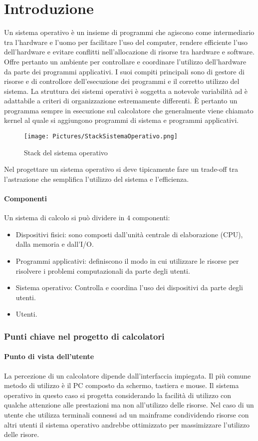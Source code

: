 \chapter{Introduzione}
Un sistema operativo è un insieme di programmi che agiscono come intermediario tra l'hardware e l'uomo per facilitare l'uso del computer, rendere efficiente l'uso dell'hardware e evitare conflitti
nell'allocazione di risorse tra hardware e software. Offre pertanto un ambiente per controllare e coordinare l'utilizzo dell'hardware da parte dei programmi applicativi. I suoi compiti principali sono di gestore di
risorse e di controllore dell'esecuzione dei programmi e il corretto utilizzo del sistema. La struttura dei sistemi operativi \`e soggetta a notevole variabilit\`a ad \`e adattabile a criteri di organizzazione estremamente differenti.
\`E pertanto un programma sempre in esecuzione sul calcolatore che generalmente viene chiamato kernel al quale si aggiungono programmi di sistema e programmi applicativi.
\begin{figure}[h]
	\texttt{[image: Pictures/StackSistemaOperativo.png]}
	\caption{Stack del sistema operativo}
\end{figure}
Nel progettare un sistema operativo si deve tipicamente fare un trade-off tra l'astrazione che semplifica l'utilizzo del sistema e l'efficienza.
\subsubsection{Componenti}
Un sistema di calcolo si pu\`o dividere in $4$ componenti:
\begin{itemize}
	\item Dispositivi fisici: sono composti dall'unit\`a centrale di elaborazione (CPU), dalla memoria e dall'I/O.
	\item Programmi applicativi: definiscono il modo in cui utilizzare le risorse per risolvere i problemi computazionali da parte degli utenti.
	\item Sistema operativo: Controlla e coordina l'uso dei dispositivi da parte degli utenti.
	\item Utenti.
\end{itemize}
\subsection{Punti chiave nel progetto di calcolatori}
\subsubsection{Punto di vista dell'utente}
La percezione di un calcolatore dipende dall'interfaccia impiegata. Il pi\`u comune metodo di utilizzo \`e il PC composto da schermo, tastiera e mouse. Il sistema operativo in questo caso si progetta considerando la facilit\`a di
utilizzo con qualche attenzione alle prestazioni ma non all'utilizzo delle risorse. Nel caso di un utente che utilizza terminali connessi ad un mainframe condividendo risorse con altri utenti il sistema operativo andrebbe ottimizzato
per massimizzare l'utilizzo delle risore.
